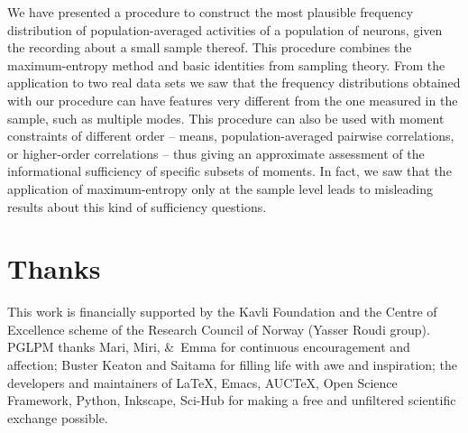 \documentclass[\ifafour a4paper,12pt,\else a5paper,10pt,\fi%
onecolumn,oneside,article,%
british%
]{memoir}
\theoremstyle{remark}
\theoremstyle{innote}
\newcommand*{\amp}{\&}
\newenvironment{acknowledgements}{\section*{Thanks}\addcontentsline{toc}{section}{Thanks}}{\par}
\newcommand*\autanet{\texttt{[image: autanet.pdf]}}
\renewcommand*{\|}{\nonscript\,\vert\nonscript\;\mathopen{}}
\begin{document}
We have presented a procedure to construct the most plausible frequency
distribution of population-averaged activities of a population of neurons,
given the recording about a small sample thereof. This procedure combines
the maximum-entropy method and basic identities from sampling theory. From
the application to two real data sets we saw that the frequency
distributions obtained with our procedure can have features very different
from the one measured in the sample, such as multiple modes. This procedure
can also be used with moment constraints of different order -- means,
population-averaged pairwise correlations, or higher-order correlations --
thus giving an approximate assessment of the informational sufficiency of
specific subsets of moments. In fact, we saw that the application of
maximum-entropy only at the sample level leads to misleading results about
this kind of sufficiency questions.






\begin{acknowledgements}
  This work is financially supported by the Kavli Foundation and the Centre
  of Excellence scheme of the  Research Council of Norway (Yasser Roudi group).\\
  PGLPM thanks Mari, Miri, \amp\ Emma for continuous encouragement and
  affection; Buster Keaton and Saitama for filling life with awe and
  inspiration; the developers and maintainers of \LaTeX, Emacs, AUC\TeX,
  Open Science Framework, Python, Inkscape, Sci-Hub for making a free and
  unfiltered scientific exchange possible.
\end{acknowledgements}

\appendix
\end{document}
